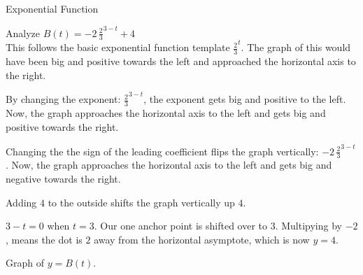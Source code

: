 \documentclass{ximera}
\begin{document}
\begin{example}  Exponential Function



Analyze   $B(t) = -2 \, \frac{2}{3}^{3-t} + 4$ \\



This follows the basic exponential function template $\frac{2}{3}^t$.  The graph of this would have been big and positive towards the left and approached the horizontal axis to the right.




By changing the exponent: $\frac{2}{3}^{3-t}$, the exponent gets big and positive to the left.  Now, the graph approaches the horizontal axis to the left and gets big and positive towards the right.



Changing the the sign of the leading coefficient flips the graph vertically: $-2  \, \frac{2}{3}^{3-t}$.  Now, the graph approaches the horizontal axis to the left and gets big and negative towards the right.


Adding $4$ to the outside shifts the graph vertically up $4$.


$3-t=0$ when $t=3$. Our one anchor point is shifted over to $3$.  Multipying by $-2$, means the dot is $2$ away from the horizontal asymptote, which is now $y=4$.





Graph of $y = B(t)$.

\begin{image}
\end{image}








\end{example}
\end{document}
